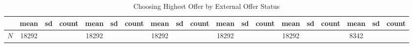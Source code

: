 \begin{table}[htbp]\centering
\def\sym#1{\ifmmode^{#1}\else\(^{#1}\)\fi}
\caption{Choosing Highest Offer by External Offer Status}
\begin{tabular}{l*{6}{ccc}}
\hline\hline
            &        mean&          sd&       count&        mean&          sd&       count&        mean&          sd&       count&        mean&          sd&       count&        mean&          sd&       count&        mean&          sd&       count\\
\hline
\hline
\(N\)       &       18292&            &            &       18292&            &            &       18292&            &            &       18292&            &            &       18292&            &            &        8342&            &            \\
\hline\hline
\end{tabular}
\end{table}
